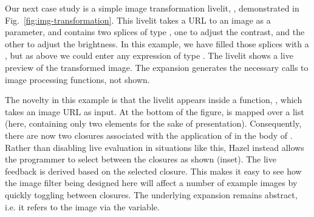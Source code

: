Our next case study is a simple image transformation livelit, ,
demonstrated in Fig.~\ref{fig:img-transformation}. This livelit takes 
a URL to an image as a parameter, and contains two splices of type ,
one to adjust the contrast, and the other to adjust the brightness.
In this example, we have filled those splices with a , but 
as above we could enter any expression of type .
The livelit shows a live preview of the transformed image.
The expansion generates the necessary calls to image processing functions, 
not shown.

The novelty in this example is that the livelit appears inside a function, 
, which takes an image URL as input. At the bottom 
of the figure,  is mapped over a list (here, containing only 
two elements for the sake of presentation). Consequently, there are now 
two closures associated with the application of  in the 
body of . Rather than disabling live evaluation in situations like 
this, Hazel instead allows the programmer to select between the closures 
as shown (inset). The live feedback is derived based on the selected closure.
This makes it easy to see how the image filter being designed here will affect a
number of example images by quickly toggling between closures. The underlying expansion remains abstract, i.e. it refers to the image via the  variable.


